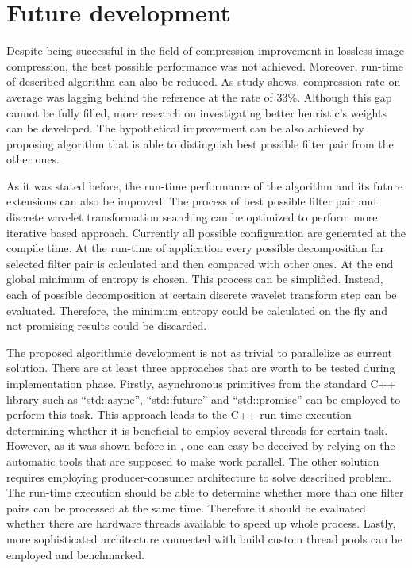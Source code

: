 \section{Future development}

Despite being successful in the field of compression improvement in lossless image compression, the best
possible performance was not achieved. Moreover, run-time of described algorithm can also be reduced.
As study shows, compression rate on average was lagging behind the reference at the rate of 33\%. Although
this gap cannot be fully filled, more research on investigating better heuristic’s weights can be developed.
The hypothetical improvement can be also achieved by proposing algorithm that is able to distinguish best
possible filter pair from the other ones.

As it was stated before, the run-time performance of the algorithm and its future extensions can also be improved.
The process of best possible filter pair and discrete wavelet transformation searching can be optimized to perform
more iterative based approach. Currently all possible configuration are generated at the compile time. At the
run-time of application every possible decomposition for selected filter pair is calculated and then compared
with other ones. At the end global minimum of entropy is chosen. This process can be simplified. Instead, each of
possible decomposition at certain discrete wavelet transform step can be evaluated. Therefore, the minimum entropy
could be calculated on the fly and not promising results could be discarded.

The proposed algorithmic development is not as trivial to parallelize as current solution. There are at least
three approaches that are worth to be tested during implementation phase. Firstly, asynchronous primitives from
the standard C++ library such as ``std::async'', ``std::future'' and ``std::promise'' can be employed to perform
this task. This approach leads to the C++ run-time execution determining whether it is beneficial to employ several
threads for certain task. However, as it was shown before in , one can easy be deceived by relying
on the automatic tools that are supposed to make work parallel. The other solution requires employing producer-consumer
architecture to solve described problem. The run-time execution should be able to determine whether more than one
filter pairs can be processed at the same time. Therefore it should be evaluated whether there are hardware threads
available to speed up whole process. Lastly, more sophisticated architecture connected with build custom thread
pools can be employed and benchmarked.

